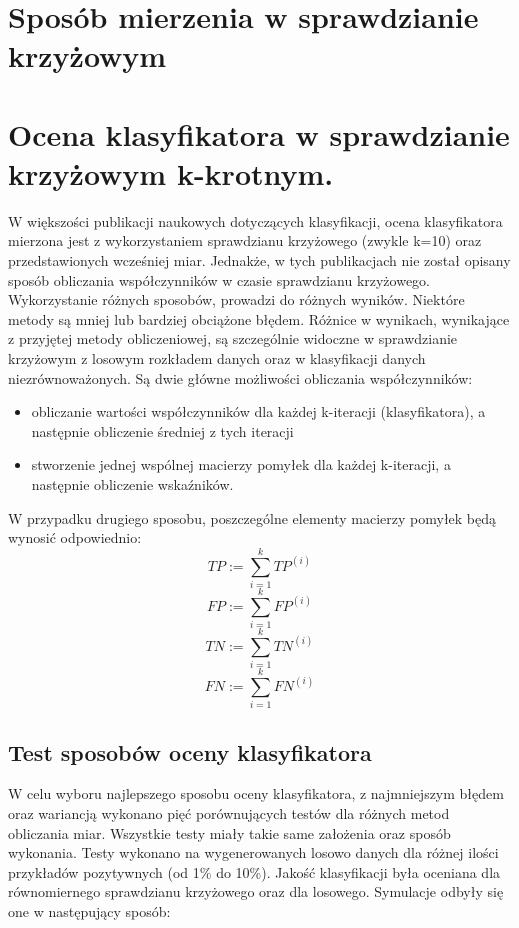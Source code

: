 \section{Sposób mierzenia w sprawdzianie krzyżowym}
\section{Ocena klasyfikatora w sprawdzianie krzyżowym k-krotnym.}
W większości publikacji naukowych dotyczących klasyfikacji, ocena klasyfikatora mierzona jest z wykorzystaniem sprawdzianu krzyżowego (zwykle k=10) oraz przedstawionych wcześniej miar. Jednakże, w tych publikacjach nie został opisany sposób obliczania współczynników w czasie sprawdzianu krzyżowego. Wykorzystanie różnych sposobów, prowadzi do różnych wyników. Niektóre metody są mniej lub bardziej obciążone błędem. Różnice w wynikach, wynikające z przyjętej metody obliczeniowej, są szczególnie widoczne w sprawdzianie krzyżowym z losowym rozkładem danych oraz w klasyfikacji danych niezrównoważonych. Są dwie główne możliwości obliczania współczynników:
\begin{itemize}
	\item obliczanie wartości współczynników dla każdej k-iteracji (klasyfikatora), a następnie obliczenie średniej z tych iteracji
	\item stworzenie jednej wspólnej macierzy pomyłek dla każdej k-iteracji, a następnie obliczenie wskaźników.
\end{itemize}
W przypadku drugiego sposobu, poszczególne elementy macierzy pomyłek będą wynosić odpowiednio:
\[TP := \sum_{i=1}^{k} TP^{(i)}\]
\[FP := \sum_{i=1}^{k} FP^{(i)}\]
\[TN := \sum_{i=1}^{k} TN^{(i)}\]
\[FN := \sum_{i=1}^{k} FN^{(i)}\]
\subsection{Test sposobów oceny klasyfikatora}
W celu wyboru najlepszego sposobu oceny klasyfikatora, z najmniejszym błędem oraz wariancją wykonano pięć porównujących testów dla różnych metod obliczania miar. Wszystkie testy miały takie same założenia oraz sposób wykonania. Testy wykonano na wygenerowanych losowo danych dla różnej ilości przykładów pozytywnych (od 1\% do 10\%). Jakość klasyfikacji była oceniana dla równomiernego sprawdzianu krzyżowego oraz dla losowego. Symulacje odbyły się one w następujący sposób:

